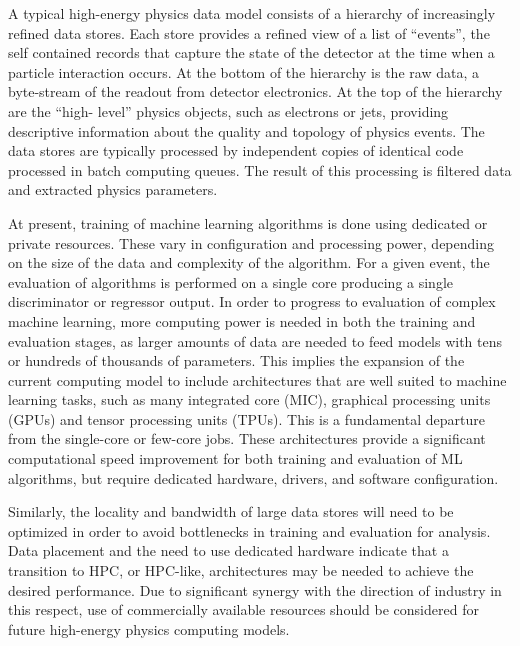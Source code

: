 
A typical high-energy physics data model consists of a hierarchy of increasingly refined data stores. Each store provides a refined view of a list of ``events'', the self contained records that capture the state of the detector at the time when a particle interaction occurs. At the bottom of the hierarchy is the raw data, a byte-stream of the readout from detector electronics. At the top of the hierarchy are the ``high- level'' physics objects, such as electrons or jets, providing descriptive information about the quality and topology of physics events. The data stores are typically processed by independent copies of identical code processed in batch computing queues. The result of this processing is filtered data and extracted physics parameters. %

At present, training of machine learning algorithms is done using dedicated or private resources. These vary in configuration and processing power, depending on the size of the data and complexity of the algorithm. For a given event, the evaluation of algorithms is performed on a single core producing a single discriminator or regressor output. In order to progress to evaluation of complex machine learning, more computing power is needed in both the training and evaluation stages, as larger amounts of data are needed to feed models with tens or hundreds of thousands of parameters. This implies the expansion of the current computing model to include architectures that are well suited to machine learning tasks, such as many integrated core (MIC), graphical processing units (GPUs) and tensor processing units (TPUs). This is a fundamental departure from the single-core or few-core jobs. These architectures provide a significant computational speed improvement for both training and evaluation of ML algorithms, but require dedicated hardware, drivers, and software configuration.

Similarly, the locality and bandwidth of large data stores will need to be optimized in order to avoid bottlenecks in training and evaluation for analysis. Data placement and the need to use dedicated hardware indicate that a transition to HPC, or HPC-like, architectures may be needed to achieve the desired performance. Due to significant synergy with the direction of industry in this respect, use of commercially available resources should be considered for future high-energy physics computing models.


